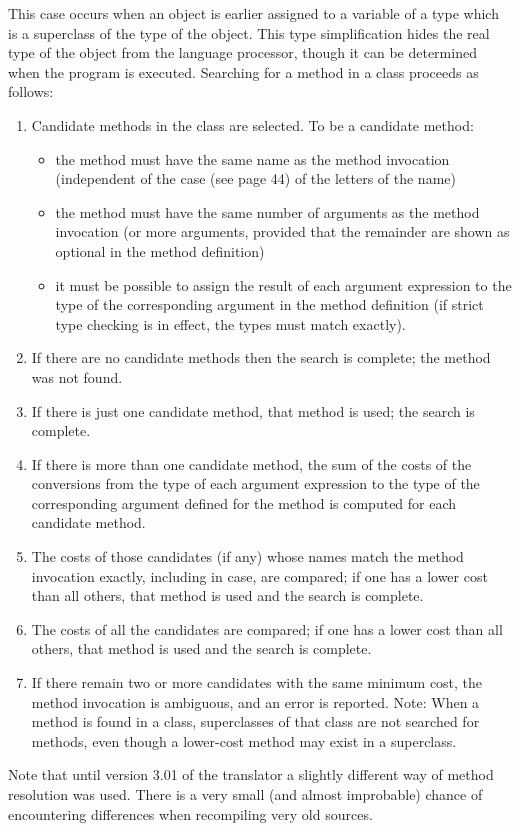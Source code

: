 This case occurs when an object is earlier assigned to a variable of a type which is a superclass of the type of the object. This type simplification hides the real type of the object from the language processor, though it can be determined when the program is executed.
Searching for a method in a class proceeds as follows:
\begin{enumerate}
\item Candidate methods in the class are selected. To be a candidate method:
 \begin{itemize}
\item the method must have the same name as the method invocation (independent of the case (see page 44) of the letters of the name)
\item the method must have the same number of arguments as the method invocation (or more arguments, provided that the remainder are shown as optional in the method definition)
\item it must be possible to assign the result of each argument expression to the type of the corresponding argument in the method definition (if strict type checking is in effect, the types must match exactly).
\end{itemize}
\item If there are no candidate methods then the search is complete; the method was not found.
\item If there is just one candidate method, that method is used; the search is complete.
\item If there is more than one candidate method, the sum of the costs of the conversions from the type of each argument expression to the type of the corresponding argument defined for the method is computed for each candidate method.
\item The costs of those candidates (if any) whose names match the method invocation exactly, including in case, are compared; if one has a lower cost than all others, that method is used and the search is complete.
\item The costs of all the candidates are compared; if one has a lower cost than all others, that method is used and the search is complete.
\item If there remain two or more candidates with the same minimum cost, the method invocation is ambiguous, and an error is reported.
Note: When a method is found in a class, superclasses of that class are not searched for methods, even though a lower-cost method may exist in a superclass.
\end{enumerate}

Note that until version 3.01 of the \nr{} translator a slightly different way of
method resolution was used. There is a very small (and almost improbable) chance of encountering differences when recompiling very old sources.

